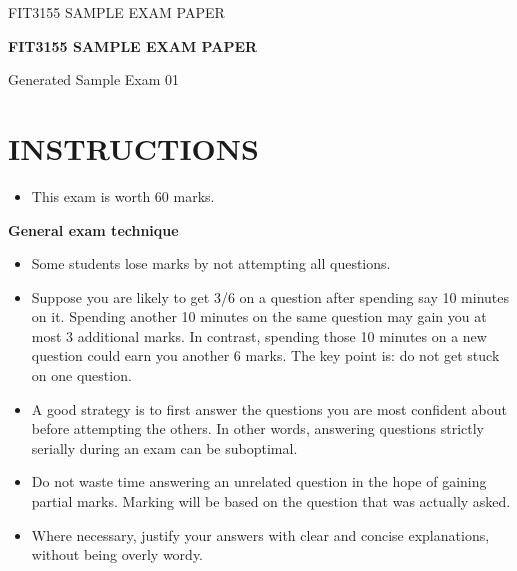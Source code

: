 \documentclass[12pt,letterpaper]{article}
\begin{document}
\begin{titlepage}
  \thispagestyle{empty}
  \vspace*{0.18\textheight}
  {\Large FIT3155 \hfill SAMPLE EXAM PAPER\par}
  \vspace{2.2cm}
  \begin{center}
    {\LARGE\bfseries FIT3155 SAMPLE EXAM PAPER\par}
    \vspace{0.8cm}
    {\large Generated Sample Exam 01\par}
  \end{center}
\end{titlepage}

\setcounter{page}{2}

\section*{INSTRUCTIONS}

\begin{itemize}
  \item This exam is worth 60 marks.
\end{itemize}

\begin{center}
  \textbf{General exam technique}
\end{center}

\begin{itemize}
  \item Some students lose marks by not attempting all questions.

  \item Suppose you are likely to get 3/6 on a question after spending say 10 minutes on it.
  Spending another 10 minutes on the same question may gain you at most 3 additional
  marks. In contrast, spending those 10 minutes on a new question could earn you another
  6 marks. The key point is: do not get stuck on one question.

  \item A good strategy is to first answer the questions you are most confident about before
  attempting the others. In other words, answering questions strictly serially during an
  exam can be suboptimal.

  \item Do not waste time answering an unrelated question in the hope of gaining partial marks.
  Marking will be based on the question that was actually asked.

  \item Where necessary, justify your answers with clear and concise explanations, without being
  overly wordy.
\end{itemize}
\end{document}
